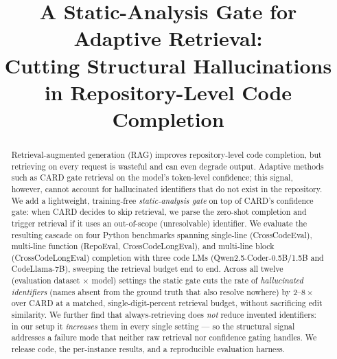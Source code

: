 \documentclass[10pt,conference]{IEEEtran}
\newcommand{\rev}[1]{{\color{red}#1}}
\newcommand{\ugr}[1]{{\color{revgreen}#1}}
\begin{document}
\title{\rev{A Static-Analysis Gate for Adaptive Retrieval:\\ Cutting Structural Hallucinations in Repository-Level Code Completion}}


\author{%
}


\maketitle



\begin{abstract}
\rev{Retrieval-augmented generation (RAG) improves repository-level code
completion, but retrieving on every request is wasteful and can even degrade
output. Adaptive methods such as CARD gate retrieval on the model's token-level
confidence; this signal, however, cannot account for hallucinated identifiers that do not exist in the repository. We add a
lightweight, training-free \emph{static-analysis gate} on top of CARD's
confidence gate: when CARD decides to skip retrieval, we parse the zero-shot
completion and trigger retrieval if it uses an out-of-scope (unresolvable)
identifier. We evaluate the resulting cascade on four Python benchmarks spanning
single-line (CrossCodeEval), multi-line function (RepoEval, CrossCodeLongEval),
and multi-line block (CrossCodeLongEval) completion with
three code LMs (Qwen2.5-Coder-0.5B/1.5B and CodeLlama-7B), sweeping the retrieval
budget end to end. Across all twelve (evaluation dataset $\times$ model) settings the
static gate cuts the rate of \ugr{\emph{hallucinated identifiers}} (names absent from the
ground truth that also resolve nowhere) \ugr{by $2$--$8\times$} over CARD at a
matched, single-digit-percent retrieval budget, \ugr{without sacrificing edit
similarity}. We further
find that always-retrieving does \emph{not} reduce invented identifiers\ugr{:
in our setup it \emph{increases} them in every single setting ---} so the structural signal addresses a failure mode
that neither raw retrieval nor confidence gating handles. We release code,
the per-instance results, and a reproducible evaluation harness.}
\end{abstract}
\end{document}
